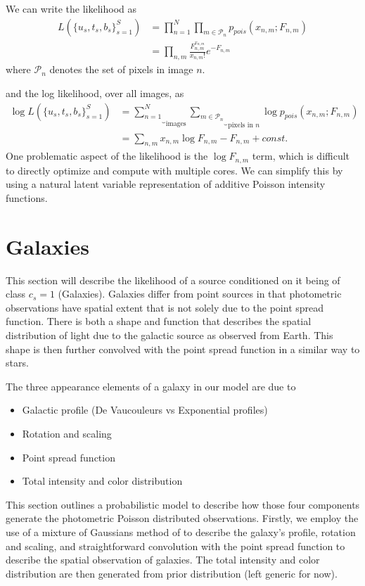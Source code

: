 \documentclass[11pt]{article}
\begin{document}
We can write the likelihood as 
\begin{align}
   L(\{u_s, t_s, b_s\}_{s=1}^S)
     &= \prod_{n=1}^N \prod_{m \in \mathcal{P}_n} p_{pois}(x_{n,m} ; F_{n,m}) \\
     &= \prod_{n,m} \frac{ F_{n,m}^{x_{n,m}}}{x_{n,m}!} e^{-F_{n,m}}
\end{align}
where $\mathcal{P}_n$ denotes the set of pixels in image $n$.  

and the log likelihood, over all images, as 
\begin{align}
  \log L(\{u_s, t_s, b_s\}_{s=1}^S) 
    &= \underbrace{\sum_{n=1}^N}_{\text{images}}
       \underbrace{\sum_{m \in \mathcal{P}_n}}_{\text{pixels in $n$}}
       \log p_{pois}(x_{n,m}; F_{n,m}) \\
    &= \sum_{n,m} x_{n,m} \log F_{n,m} - F_{n,m} + const.
\end{align}
One problematic aspect of the likelihood is the $\log F_{n,m}$ term, which is difficult to directly optimize and compute with multiple cores.  We can simplify this by using a natural latent variable representation of additive Poisson intensity functions.  

\section{Galaxies}
This section will describe the likelihood of a source conditioned on it being of class $c_s = 1$ (Galaxies).  Galaxies differ from point sources in that photometric observations have spatial extent that is not solely due to the point spread function.  There is both a shape and function that describes the spatial distribution of light due to the galactic source as observed from Earth.  This shape is then further convolved with the point spread function in a similar way to stars.  

The three appearance elements of a galaxy in our model are due to 
\begin{itemize}
\item Galactic profile (De Vaucouleurs vs Exponential profiles)
\item Rotation and scaling 
\item Point spread function 
\item Total intensity and color distribution 
\end{itemize}

This section outlines a probabilistic model to describe how those four components generate the photometric Poisson distributed observations. Firstly, we employ the use of a mixture of Gaussians method of  to describe the galaxy's profile, rotation and scaling, and straightforward convolution with the point spread function to describe the spatial observation of galaxies.  The total intensity and color distribution are then generated from prior distribution (left generic for now).
\end{document}
